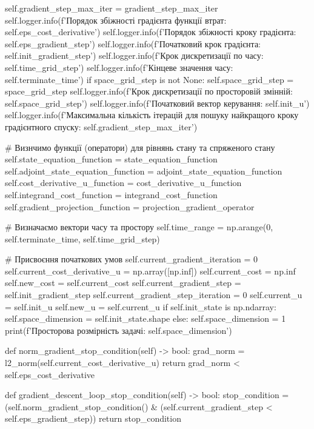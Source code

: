 \documentclass[a4paper,12pt]{extreport}
\begin{document}
\begin{python}[utf8]
            self.gradient_step_max_iter = gradient_step_max_iter
            self.logger.info(f'Порядок збіжності градієнта функції втрат: {self.eps_cost_derivative}')
            self.logger.info(f'Порядок збіжності кроку градієнта: {self.eps_gradient_step}')
            self.logger.info(f'Початковий крок градієнта: {self.init_gradient_step}')
            self.logger.info(f'Крок дискретизації по часу: {self.time_grid_step}')
            self.logger.info(f'Кінцеве значення часу: {self.terminate_time}')
            if space_grid_step is not None:
                self.space_grid_step = space_grid_step
                self.logger.info(f'Крок дискретизації по просторовій змінній: {self.space_grid_step}')
            self.logger.info(f'Початковий вектор керування: {self.init_u}')
            self.logger.info(f'Максимальна кількість ітерацій для пошуку найкращого кроку градієнтного спуску: {self.gradient_step_max_iter}')
    
            # Визнчимо функції (оператори) для рівнянь стану та спряженого стану
            self.state_equation_function = state_equation_function
            self.adjoint_state_equation_function = adjoint_state_equation_function
            self.cost_derivative_u_function = cost_derivative_u_function
            self.integrand_cost_function = integrand_cost_function
            self.gradient_projection_function = projection_gradient_operator
    
            # Визначаємо вектори часу та простору
            self.time_range = np.arange(0, self.terminate_time, self.time_grid_step)
    
            # Присвоєння початкових умов
            self.current_gradient_iteration = 0
            self.current_cost_derivative_u = np.array([np.inf])
            self.current_cost = np.inf
            self.new_cost = self.current_cost
            self.current_gradient_step = self.init_gradient_step
            self.current_gradient_step_iteration = 0
            self.current_u = self.init_u
            self.new_u = self.current_u
            if self.init_state is np.ndarray:
                self.space_dimension = self.init_state.shape
            else:
                self.space_dimension = 1
            print(f'Просторова розмірність задачі: {self.space_dimension}')
    
        def norm_gradient_stop_condition(self) -> bool:
            grad_norm = l2_norm(self.current_cost_derivative_u)
            return grad_norm < self.eps_cost_derivative
    
        def gradient_descent_loop_stop_condition(self) -> bool:
            stop_condition = (self.norm_gradient_stop_condition() &
                              (self.current_gradient_step < self.eps_gradient_step))
            return stop_condition
    

\end{python}
\end{document}
